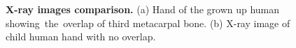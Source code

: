\begin{figure}[!ht]
    \centering
    \begin{subfigure}[b]{.45\textwidth}
    \centering
        \caption{}\label{overlap-img}
    \end{subfigure}
    \begin{subfigure}[b]{.45\textwidth}
    \centering
        \caption{}\label{non-overlap-img}
    \end{subfigure}
    
    \caption{\textbf{X-ray images comparison.} (a) Hand of the grown up human showing~the~overlap of third metacarpal bone. (b) X-ray image of child human hand with no overlap.}
    \label{overlap-images}
\end{figure}

